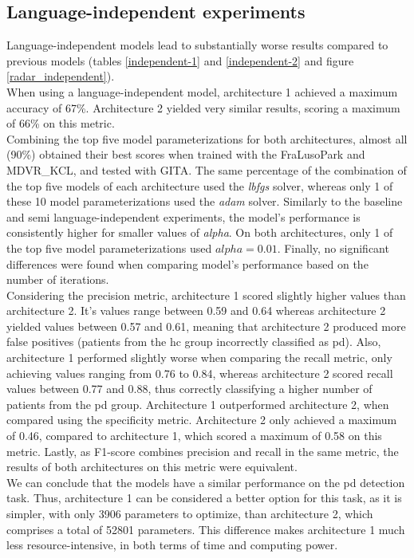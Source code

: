 \subsection{Language-independent experiments}

Language-independent models lead to substantially worse results compared to previous models (tables \ref{independent-1} and \ref{independent-2} and figure \ref{radar_independent}). \\
When using a language-independent model, architecture 1 achieved a maximum accuracy of 67\%. Architecture 2 yielded very similar results, scoring a maximum of 66\% on this metric. \\
Combining the top five model parameterizations for both architectures, almost all (90\%) obtained their best scores when trained with the FraLusoPark and MDVR\_KCL, and tested with GITA. The same percentage of the combination of the top five models of each architecture used the \textit{lbfgs} solver, whereas only 1 of these 10 model parameterizations used the \textit{adam} solver. Similarly to the baseline and semi language-independent experiments, the model's performance is consistently higher for smaller values of \textit{alpha}. On both architectures, only 1 of the top five model parameterizations used $alpha = 0.01$. Finally, no significant differences were found when comparing model's performance based on the number of iterations. \\
Considering the precision metric, architecture 1 scored slightly higher values than architecture 2. It's values range between 0.59 and 0.64 whereas architecture 2 yielded values between 0.57 and 0.61, meaning that architecture 2 produced more false positives (patients from the \gls{hc} group incorrectly classified as \gls{pd}). Also, architecture 1 performed slightly worse when comparing the recall metric, only achieving values ranging from 0.76 to 0.84, whereas architecture 2 scored recall values between 0.77 and 0.88, thus correctly classifying a higher number of patients from the \gls{pd} group. Architecture 1 outperformed architecture 2, when compared using the specificity metric. Architecture 2 only achieved a maximum of 0.46, compared to architecture 1, which scored a maximum of 0.58 on this metric. Lastly, as F1-score combines precision and recall in the same metric, the results of both architectures on this metric were equivalent. \\
We can conclude that the models have a similar performance on the \gls{pd} detection task. Thus, architecture 1 can be considered a better option for this task, as it is simpler, with only 3906 parameters to optimize, than architecture 2, which comprises a total of 52801 parameters. This difference makes architecture 1 much less resource-intensive, in both terms of time and computing power.

